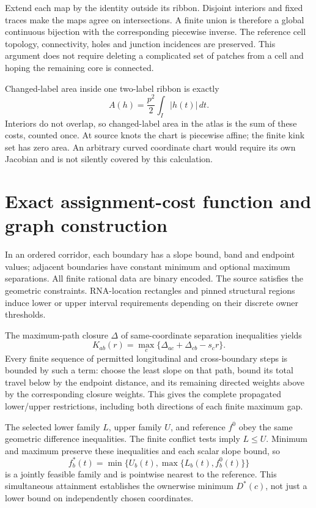 \documentclass[10pt,letterpaper]{article}
\begin{document}
Extend each map by the identity outside its ribbon. Disjoint interiors and fixed traces make the maps agree on intersections. A finite union is therefore a global continuous bijection with the corresponding piecewise inverse. The reference cell topology, connectivity, holes and junction incidences are preserved. This argument does not require deleting a complicated set of patches from a cell and hoping the remaining core is connected.

Changed-label area inside one two-label ribbon is exactly
\[
 A(h)=\frac{p^2}{2}\int_I |h(t)|\,dt.
\]
Interiors do not overlap, so changed-label area in the atlas is the sum of these costs, counted once. At source knots the chart is piecewise affine; the finite kink set has zero area. An arbitrary curved coordinate chart would require its own Jacobian and is not silently covered by this calculation.

\section{Exact assignment-cost function and graph construction}
In an ordered corridor, each boundary has a slope bound, band and endpoint values; adjacent boundaries have constant minimum and optional maximum separations. All finite rational data are binary encoded. The source satisfies the geometric constraints. RNA-location rectangles and pinned structural regions induce lower or upper interval requirements depending on their discrete owner thresholds.

The maximum-path closure $\Delta$ of same-coordinate separation inequalities yields
\[
 K_{ab}(r)=\max_c\{\Delta_{ac}+\Delta_{cb}-s_cr\}.
\]
Every finite sequence of permitted longitudinal and cross-boundary steps is bounded by such a term: choose the least slope on that path, bound its total travel below by the endpoint distance, and its remaining directed weights above by the corresponding closure weights. This gives the complete propagated lower/upper restrictions, including both directions of each finite maximum gap.

The selected lower family $L$, upper family $U$, and reference $f^0$ obey the same geometric difference inequalities. The finite conflict tests imply $L\le U$. Minimum and maximum preserve these inequalities and each scalar slope bound, so
\[
 f_b^*(t)=\min\{U_b(t),\max\{L_b(t),f_b^0(t)\}\}
\]
is a jointly feasible family and is pointwise nearest to the reference. This simultaneous attainment establishes the ownerwise minimum $D^*(c)$, not just a lower bound on independently chosen coordinates.
\end{document}
